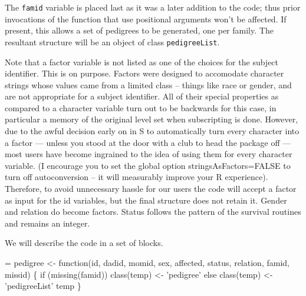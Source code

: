 \documentclass{article}
\begin{document}
The \Verb!famid! variable is placed last as it was a later addition to the
code; thus prior invocations of the function that use positional 
arguments won't be affected.                                       %
If present, this allows a set of pedigrees to be generated, one per
family.  The resultant structure will be an object of class
\Verb!pedigreeList!.

Note that a factor variable is not listed as one of the choices for the
subject identifier. This is on purpose.  Factors
were designed to accomodate character strings whose values came from a limited
class -- things like race or gender, and are not appropriate for a subject
identifier.  All of their special properties as compared to a character
variable turn out to be backwards for this case, in particular a memory
of the original level set when subscripting is done.
However, due to the awful decision early on in S to automatically turn every
character into a factor --- unless you stood at the door with a club to
head the package off --- most users have become ingrained to the idea of
using them for every character variable. 
(I encourage you to set the global option stringsAsFactors=FALSE to turn
off autoconversion -- it will measurably improve your R experience).
Therefore, to avoid unnecessary hassle for our users 
the code will accept a factor as input for the id variables, but
the final structure does not retain it.  
Gender and relation do become factors.  Status follows the pattern of the 
survival routines and remains an integer.

We will describe the code in a set of blocks.
\begin{nwchunk}
=
 pedigree <- function(id, dadid, momid, sex, affected, status, relation,
                      famid, missid) \{
     if (missing(famid)) class(temp) <- 'pedigree'
     else class(temp) <- 'pedigreeList'
     temp
     \}
\end{nwchunk}
\end{document}
